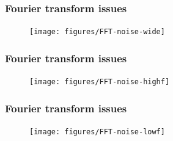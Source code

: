 \documentclass{beamer}
\begin{document}
\begin{frame}
    \frametitle{Fourier transform issues}
    
    \begin{figure}[ht]
    \centering
    \texttt{[image: figures/FFT-noise-wide]}
    \label{fig:fft-noise-wide}
    \end{figure}
\end{frame}

\begin{frame}
    \frametitle{Fourier transform issues}
    
    \begin{figure}[ht]
    \centering
    \texttt{[image: figures/FFT-noise-highf]}
    \label{fig:fft-noise-highf}
    \end{figure}
\end{frame}

\begin{frame}
    \frametitle{Fourier transform issues}
    
    \begin{figure}[ht]
    \centering
    \texttt{[image: figures/FFT-noise-lowf]}
    \label{fig:fft-noise-lowf}
    \end{figure}
\end{frame}



    


\end{document}
